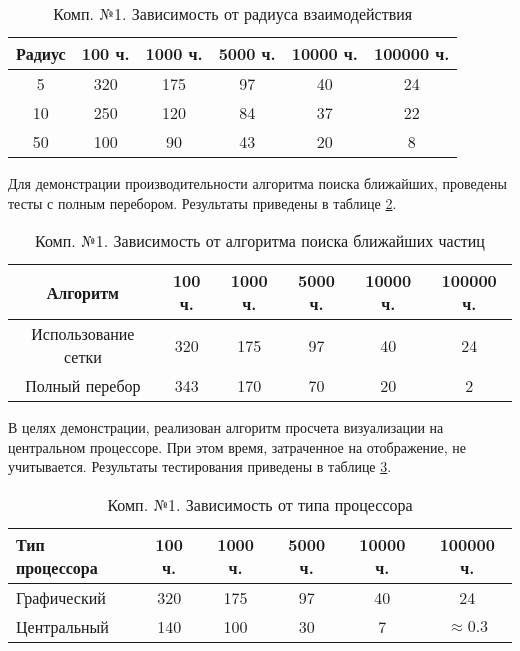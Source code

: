\begin{table}[H]
  \caption{\label{tab:fst:radius}Комп. №1. Зависимость от радиуса взаимодействия}
  \begin{center}
    \begin{tabular}{|c|c|c|c|c|c|}
      \hline
      Радиус & 100 ч. & 1000 ч. & 5000 ч. & 10000 ч. & 100000 ч. \\
      \hline
      5 & 320 & 175 & 97 & 40 & 24 \\
      10 & 250 & 120 & 84 & 37 & 22 \\
      50 & 100 & 90 & 43 & 20 & 8 \\
      \hline
    \end{tabular}
  \end{center}
\end{table}

Для демонстрации производительности алгоритма поиска ближайших, проведены
тесты с полным перебором. Результаты приведены в таблице \ref{tab:fst:algorithm}.

\begin{table}[H]
  \caption{\label{tab:fst:algorithm}Комп. №1. Зависимость от алгоритма поиска ближайших частиц}
  \begin{center}
    \begin{tabular}{|c|c|c|c|c|c|}
      \hline
      Алгоритм & 100 ч. & 1000 ч. & 5000 ч. & 10000 ч. & 100000 ч. \\
      \hline
      Использование сетки & 320 & 175 & 97 & 40 & 24 \\
      Полный перебор & 343 & 170 & 70 & 20 & 2 \\
      \hline
    \end{tabular}
  \end{center}
\end{table}

В целях демонстрации, реализован алгоритм просчета визуализации на центральном процессоре.
При этом время, затраченное на отображение, не учитывается. Результаты тестирования 
приведены в таблице \ref{tab:fst:cpu}.  \\

\begin{table}[H] 
  \caption{\label{tab:fst:cpu}Комп. №1. Зависимость от типа процессора} 
  \begin{center} 
    \begin{tabular}{|l|c|c|c|c|c|} 
      \hline
      Тип процессора & 100 ч. & 1000 ч. & 5000 ч. & 10000 ч. & 100000 ч. \\
      \hline
      Графический & 320 & 175 & 97 & 40 & 24 \\
      Центральный & 140 & 100 & 30 & 7 & $\approx{}0.3$ \\
      \hline
    \end{tabular} 
  \end{center} 
\end{table} 


